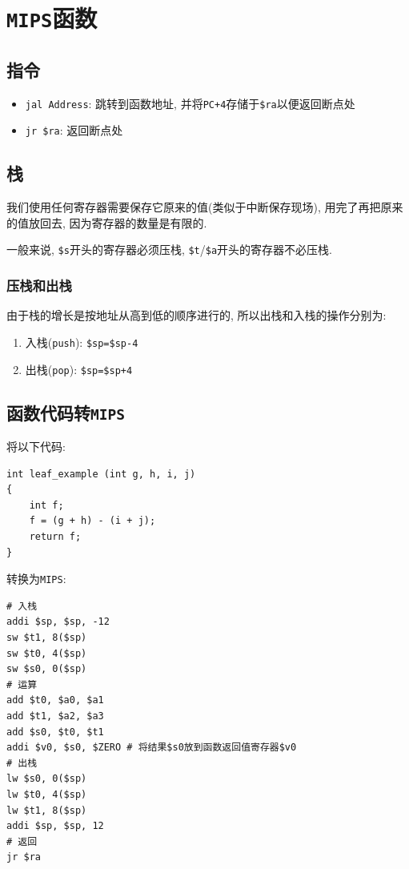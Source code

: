 \section{\texttt{MIPS}函数}
\subsection{指令}
\begin{itemize}
\item \verb|jal Address|: 跳转到函数地址, 并将\verb|PC+4|存储于\verb|$ra|以便返回断点处
\item \verb|jr $ra|: 返回断点处
\end{itemize}
\subsection{栈}
我们使用任何寄存器需要保存它原来的值(类似于中断保存现场), 用完了再把原来的值放回去, 因为寄存器的数量是有限的. \par 
一般来说, \verb|$s|开头的寄存器必须压栈, \verb|$t|/\verb|$a|开头的寄存器不必压栈.
\subsubsection{压栈和出栈}
由于栈的增长是按地址从高到低的顺序进行的, 所以出栈和入栈的操作分别为:
\begin{enumerate}
\item 入栈(\verb|push|): \verb|$sp=$sp-4|
\item 出栈(\verb|pop|): \verb|$sp=$sp+4|
\end{enumerate}
\subsection{函数代码转\texttt{MIPS}}
将以下代码:
\begin{lstlisting}
int leaf_example (int g, h, i, j)
{
    int f;
    f = (g + h) - (i + j);
    return f;
}
\end{lstlisting}\par
转换为\texttt{MIPS}:
\begin{lstlisting}
# 入栈
addi $sp, $sp, -12
sw $t1, 8($sp)
sw $t0, 4($sp)
sw $s0, 0($sp)
# 运算
add $t0, $a0, $a1
add $t1, $a2, $a3
add $s0, $t0, $t1
addi $v0, $s0, $ZERO # 将结果$s0放到函数返回值寄存器$v0
# 出栈
lw $s0, 0($sp)
lw $t0, 4($sp)
lw $t1, 8($sp)
addi $sp, $sp, 12
# 返回
jr $ra
\end{lstlisting}
